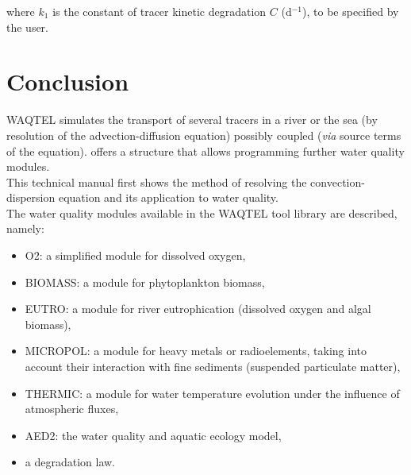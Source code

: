\documentclass[Waqtel]{../../data/TelemacDoc} %
\begin{document}
where $k_1$ is the constant of tracer kinetic degradation $C$ (d$^{-1}$),
to be specified by the user.


\chapter{Conclusion}

WAQTEL simulates the transport of several tracers in a river or the sea
(by resolution of the advection-diffusion equation) possibly coupled
(\textit{via} source terms of the equation).
\waqtel offers a structure that allows programming further water quality modules.\\

This technical manual first shows the method of resolving the convection-dispersion equation
and its application to water quality.\\

The water quality modules available in the WAQTEL tool library are described,
namely:

\begin{itemize}
\item O2: a simplified module for dissolved oxygen,
\item BIOMASS: a module for phytoplankton biomass,
\item EUTRO: a module for river eutrophication (dissolved oxygen and algal biomass),
\item MICROPOL: a module for heavy metals or radioelements,
  taking into account their interaction with fine sediments (suspended particulate matter),
\item THERMIC: a module for water temperature evolution under the influence of atmospheric fluxes,
\item AED2: the water quality and aquatic ecology model,
\item a degradation law.
\end{itemize}




%



\end{document}
